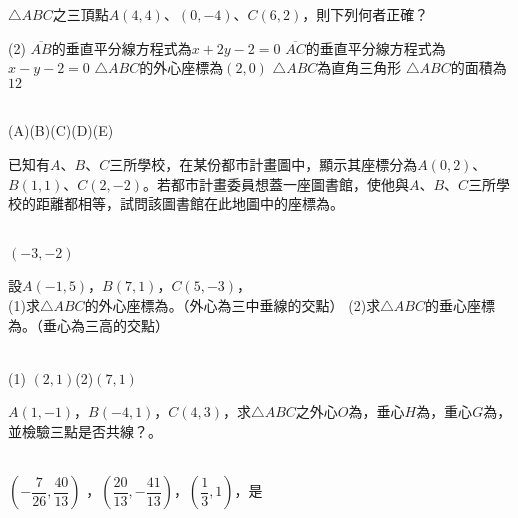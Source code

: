 \documentclass
[answers]
{exam}
\newcommand\ul[1]{\uline{\hspace*{#1}}}
\theoremstyle{definition}
\begin{document}
\begin{questions}

\question

$\triangle ABC$之三頂點$A\left( 4,4\right)$、$\left( 0,-4\right)$、$C\left( 6,2\right)$，則下列何者正確？

\begin{tasks}(2)
	\task $\overline{AB}$的垂直平分線方程式為$x+2y-2=0$
	\task $\overline{AC}$的垂直平分線方程式為$x-y-2=0$
	\task $\triangle ABC$的外心座標為$\left( 2,0\right)$
	\task $\triangle ABC$為直角三角形
	\task $\triangle ABC$的面積為$12$
\end{tasks}
\begin{solution}~\\
	(A)(B)(C)(D)(E)
\end{solution}

\question

已知有$A$、$B$、$C$三所學校，在某份都市計畫圖中，顯示其座標分為$A\left( 0,2\right)$、$B\left( 1,1\right)$、$C\left( 2,-2\right)$。若都市計畫委員想蓋一座圖書館，使他與$A$、$B$、$C$三所學校的距離都相等，試問該圖書館在此地圖中的座標為\ul{50pt}。
\\ 
\begin{solution}~\\
	$\left( -3,-2\right)$
\end{solution}

\question

設$A\left( -1,5\right)$，$B\left( 7,1\right)$，$C\left( 5,-3\right)$，\\
(1)求$\triangle ABC$的外心座標為\ul{50pt}。（外心為三中垂線的交點）
(2)求$\triangle ABC$的垂心座標為\ul{50pt}。（垂心為三高的交點）
\\ 
\begin{solution}~\\
	(1) $\left( 2,1\right)$(2)$\left( 7,1\right)$
\end{solution}

\question

$A\left( 1,-1\right)$，$B\left( -4,1\right)$，$C\left( 4,3\right)$，求$\triangle ABC$之外心$O$為\ul{50pt}，垂心$H$為\ul{50pt}，重心$G$為\ul{50pt}，並檢驗三點是否共線？\ul{50pt}。
\\ 
\begin{solution}~\\
	$\left( -\dfrac{7}{26} ,\dfrac{40}{13} \right)$ ，$\left( \dfrac{20}{13},-\dfrac{41}{13} \right)$，$\left( \dfrac{1}{3},1 \right)$，是
\end{solution}


\end{questions}
\end{document}
